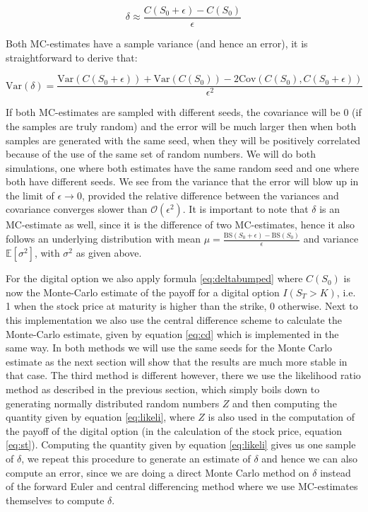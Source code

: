 \documentclass[11pt,a4paper]{article}
\begin{document}
\begin{equation}
  \label{eq:deltabumped}
  \delta \approx \frac{C(S_0 + \epsilon) - C(S_0)}{\epsilon}
\end{equation}

Both MC-estimates have a sample variance (and hence an error), it is straightforward to derive that:

\begin{equation}
  \text{Var}(\delta) = \frac{\text{Var}(C(S_0+\epsilon)) + \text{Var}(C(S_0)) - 2\text{Cov}(C(S_0),C(S_0 + \epsilon))}{\epsilon^2}
\end{equation}

If both MC-estimates are sampled with different seeds, the covariance will be 0 (if the samples are truly random) and the error will be much larger then when both samples are generated with the same seed, when they will be positively correlated because of the use of the same set of random numbers. We will do both simulations, one where both estimates have the same random seed and one where both have different seeds. We see from the variance that the error will blow up in the limit of $\epsilon \rightarrow 0$, provided the relative difference between the variances and covariance converges slower than $\mathcal{O}(\epsilon^2)$. It is important to note that $\delta$ is an MC-estimate as well, since it is the difference of two MC-estimates, hence it also follows an underlying distribution with mean $\mu = \frac{\text{BS}(S_0 + \epsilon) - \text{BS}(S_0)}{\epsilon}$ and variance $\mathbb{E}[\sigma^2]$, with $\sigma^2$ as given above.

For the digital option we also apply formula \ref{eq:deltabumped} where $C(S_0)$ is now the Monte-Carlo estimate of the payoff for a digital option $I{(S_T > K)}$, i.e. 1 when the stock price at maturity is higher than the strike, 0 otherwise. Next to this implementation we also use the central difference scheme to calculate the Monte-Carlo estimate, given by equation \ref{eq:cd} which is implemented in the same way. In both methods we will use the same seeds for the Monte Carlo estimate as the next section will show that the results are much more stable in that case. The third method is different however, there we use the likelihood ratio method as described in the previous section, which simply boils down to generating normally distributed random numbers $Z$ and then computing the quantity given by equation \ref{eq:likeli}, where $Z$ is also used in the computation of the payoff of the digital option (in the calculation of the stock price, equation \ref{eq:st}). Computing the quantity given by equation \ref{eq:likeli} gives us one sample of $\delta$, we repeat this procedure to generate an estimate of $\delta$ and hence we can also compute an error, since we are doing a direct Monte Carlo method on $\delta$ instead of the forward Euler and central differencing method where we use MC-estimates themselves to compute $\delta$.
\end{document}

